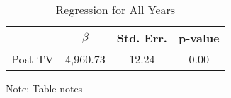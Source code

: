 \noindent 

\begin{table}[H]

\caption{Regression for All Years\label{tab:regression}}

\medskip{}



\begin{centering}

\begin{tabular}{cccc}

\hline 

 & $\beta$ & Std. Err. & p-value\tabularnewline

\hline 

Post-TV & 4,960.73 & 12.24 & 0.00\tabularnewline

\hline 

\end{tabular}

\par\end{centering}

\begin{centering}

\medskip{}

\par\end{centering}

{\footnotesize{}Note: Table notes}{\footnotesize\par}

\end{table}